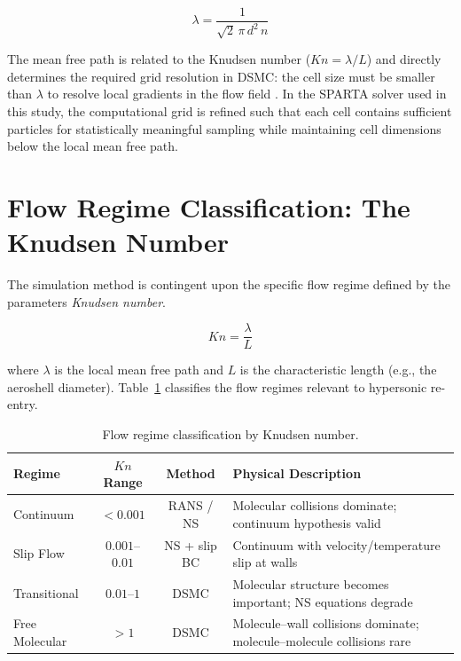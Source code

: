 \begin{equation}
    \lambda = \frac{1}{\sqrt{2} \, \pi \, d^2 \, n}
    \label{eq:mean_free_path}
\end{equation}

\noindent The mean free path is related to the Knudsen number ($Kn = \lambda / L$) and directly determines the required grid resolution in DSMC: the cell size must be smaller than $\lambda$ to resolve local gradients in the flow field \cite{bird1994molecular}. In the SPARTA solver used in this study, the computational grid is refined such that each cell contains sufficient particles for statistically meaningful sampling while maintaining cell dimensions below the local mean free path.

\section{Flow Regime Classification: The Knudsen Number}

The simulation method is contingent upon the specific flow regime defined by the parameters \textit{Knudsen number}.

\begin{equation}
    Kn = \frac{\lambda}{L}
    \label{eq:knudsen_definition}
\end{equation}

\noindent where $\lambda$ is the local mean free path and $L$ is the characteristic length (e.g., the aeroshell diameter). Table~\ref{tab:knudsen_regimes} classifies the flow regimes relevant to hypersonic re-entry.

\begin{table}[H]
    \centering
    \caption{Flow regime classification by Knudsen number.}
    \label{tab:knudsen_regimes}
    \begin{tabular}{|l|c|c|p{4.5cm}|}
    \hline
    \textbf{Regime} & \textbf{$Kn$ Range} & \textbf{Method} & \textbf{Physical Description} \\ \hline
    Continuum & $< 0.001$ & RANS / NS & Molecular collisions dominate; continuum hypothesis valid \\ \hline
    Slip Flow & $0.001$--$0.01$ & NS + slip BC & Continuum with velocity/temperature slip at walls \\ \hline
    Transitional & $0.01$--$1$ & DSMC & Molecular structure becomes important; NS equations degrade \\ \hline
    Free Molecular & $> 1$ & DSMC & Molecule--wall collisions dominate; molecule--molecule collisions rare \\ \hline
    \end{tabular}
\end{table}

